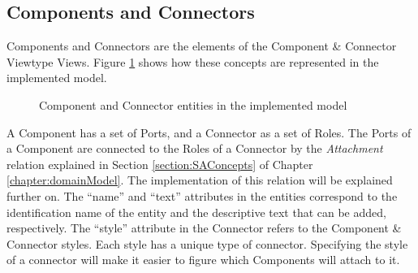 \subsection{Components and Connectors}
\label{subsection:modelComponentsConnectors}
Components and Connectors are the elements of the Component \& Connector Viewtype Views. Figure \ref{figure:modelComponentConnector} shows how these concepts are represented in the implemented model.

\begin{figure}[h]
\centering
\renewcommand {\umltextcolor}{black}
\renewcommand {\umlfillcolor}{none}
\renewcommand {\umldrawcolor}{black}
\caption{Component and Connector entities in the implemented model}
\label{figure:modelComponentConnector}
\end{figure}
 
A Component has a set of Ports, and a Connector as a set of Roles. The Ports of a Component are connected to the Roles of a Connector by the \textit{Attachment} relation explained in Section \ref{section:SAConcepts} of Chapter \ref{chapter:domainModel}. The implementation of this relation will be explained further on. The ``name'' and ``text'' attributes in the entities correspond to the identification name of the entity and the descriptive text that can be added, respectively. The ``style'' attribute in the Connector refers to the Component \& Connector styles. Each style has a unique type of connector. Specifying the style of a connector will make it easier to figure which Components will attach to it.

